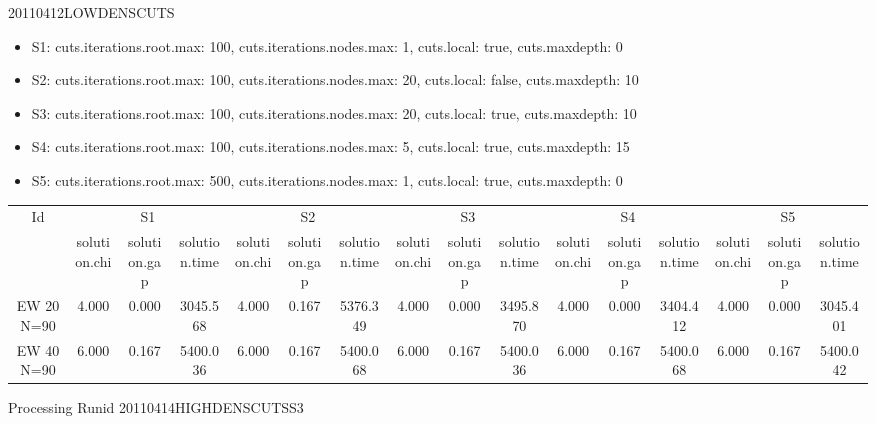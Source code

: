 \documentclass[landscape, 12pt]{report}
\begin{document}
20110412LOWDENSCUTS

\begin{itemize}
\item S1: cuts.iterations.root.max: 100, cuts.iterations.nodes.max: 1, cuts.local: true, cuts.maxdepth: 0
\item S2: cuts.iterations.root.max: 100, cuts.iterations.nodes.max: 20, cuts.local: false, cuts.maxdepth: 10
\item S3: cuts.iterations.root.max: 100, cuts.iterations.nodes.max: 20, cuts.local: true, cuts.maxdepth: 10
\item S4: cuts.iterations.root.max: 100, cuts.iterations.nodes.max: 5, cuts.local: true, cuts.maxdepth: 15
\item S5: cuts.iterations.root.max: 500, cuts.iterations.nodes.max: 1, cuts.local: true, cuts.maxdepth: 0
\end{itemize}
\begin{tabular}{|c|ccc|ccc|ccc|ccc|ccc|}
\hline
\multicolumn{1}{|c|}{Id} & \multicolumn{3}{|c|}{S1} & \multicolumn{3}{|c|}{S2} & \multicolumn{3}{|c|}{S3} & \multicolumn{3}{|c|}{S4} & \multicolumn{3}{|c|}{S5}
\\
 & solution.chi & solution.gap & solution.time & solution.chi & solution.gap & solution.time & solution.chi & solution.gap & solution.time & solution.chi & solution.gap & solution.time & solution.chi & solution.gap & solution.time
\\
\hline
EW 20 N=90 & 4.000 & 0.000 & 3045.568 & 4.000 & 0.167 & 5376.349 & 4.000 & 0.000 & 3495.870 & 4.000 & 0.000 & 3404.412 & 4.000 & 0.000 & 3045.401
\\
EW 40 N=90 & 6.000 & 0.167 & 5400.036 & 6.000 & 0.167 & 5400.068 & 6.000 & 0.167 & 5400.036 & 6.000 & 0.167 & 5400.068 & 6.000 & 0.167 & 5400.042
\\
\hline 
 \end{tabular}

Processing Runid 20110414HIGHDENSCUTSS3
\end{document}
